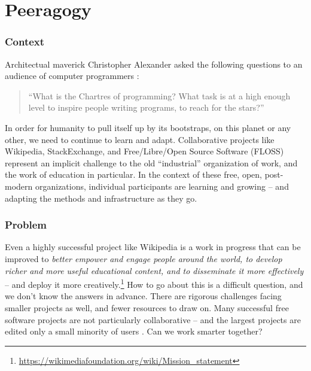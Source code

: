\section{Peeragogy}\label{sec:Peeragogy_Project}

\subsubsection*{Context}  Architectual maverick Christopher Alexander asked the following questions to an audience of computer programmers \cite{alexander1999origins}: 
\begin{quote}
``What is the Chartres of programming? What task is at a high enough level to inspire people writing programs, to reach for the stars?''
\end{quote}
In order for humanity to pull itself up by its bootstraps, on this planet or any other, we need to continue to learn and adapt.  Collaborative projects like Wikipedia, StackExchange, and Free/Libre/Open Source Software (FLOSS) represent an implicit challenge to the old ``industrial'' organization of work, and the work of education in particular.  In the context of these free, open, post-modern organizations, individual participants are learning and growing -- and adapting the methods and infrastructure as they go.

\subsubsection*{Problem} Even a highly successful project like Wikipedia is a work in progress that can be improved to \emph{\emph{better} empower and engage people around the world, to develop \emph{richer and more useful} educational content, and to disseminate it \emph{more} effectively} -- and deploy it more creatively.\footnote{\url{https://wikimediafoundation.org/wiki/Mission_statement}}  How to go about this is a difficult question, and we don't know the answers in advance.  There are rigorous challenges facing smaller projects as well, and fewer resources to draw on.  Many successful free software projects are not particularly collaborative -- and the largest projects are edited only a small minority of users \cite{free-software-better,who-writes-wikipedia}.  Can we work smarter together?

